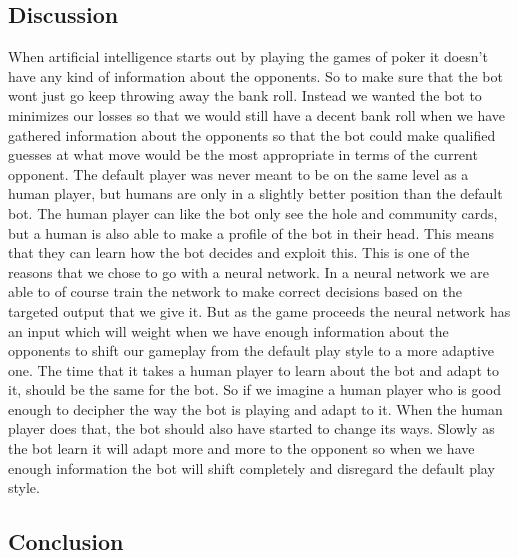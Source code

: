 \subsection{Discussion}
When artificial intelligence starts out by playing the games of poker it doesn't have any kind of information about the opponents. So to make sure that the bot wont just go keep throwing away the bank roll. Instead we wanted the bot to minimizes our losses so that we would still have a decent bank roll when we have gathered information about the opponents so that the bot could make qualified guesses at what move would be the most appropriate in terms of the current opponent. The default player was never meant to be on the same level as a human player, but humans are only in a slightly better position than the default bot. The human player can like the bot only see the hole and community cards, but a human is also able to make a profile of the bot in their head. This means that they can learn how the bot decides and exploit this. 
This is one of the reasons that we chose to go with a neural network. In a neural network we are able to of course train the network to make correct decisions based on the targeted output that we give it.
But as the game proceeds the neural network has an input which will weight when we have enough information about the opponents to shift our gameplay from the default play style to a more adaptive one.
The time that it takes a human player to learn about the bot and adapt to it, should be the same for the bot. So if we imagine a human player who is good enough to decipher the way the bot is playing and adapt to it. When the human player does that, the bot should also have started to change its ways. Slowly as the bot learn it will adapt more and more to the opponent so when we have enough information the bot will shift completely and disregard the default play style.
\subsection{Conclusion}
